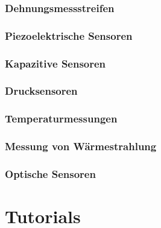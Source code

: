 \documentclass[letterpaper,10pt,english]{jupyterBook}
\begin{document}
\section{Dehnungsmessstreifen}
\label{\detokenize{content/6_DMS:dehnungsmessstreifen}}\label{\detokenize{content/6_DMS::doc}}
\sphinxstepscope


\section{Piezoelektrische Sensoren}
\label{\detokenize{content/6_PZT:piezoelektrische-sensoren}}\label{\detokenize{content/6_PZT::doc}}
\sphinxstepscope


\section{Kapazitive Sensoren}
\label{\detokenize{content/6_Kapazitiv:kapazitive-sensoren}}\label{\detokenize{content/6_Kapazitiv::doc}}
\sphinxstepscope


\section{Drucksensoren}
\label{\detokenize{content/6_Druck:drucksensoren}}\label{\detokenize{content/6_Druck::doc}}
\sphinxstepscope


\section{Temperaturmessungen}
\label{\detokenize{content/6_Temp:temperaturmessungen}}\label{\detokenize{content/6_Temp::doc}}
\sphinxstepscope


\section{Messung von Wärmestrahlung}
\label{\detokenize{content/6_W_xe4rme:messung-von-warmestrahlung}}\label{\detokenize{content/6_W_xe4rme::doc}}
\sphinxstepscope


\section{Optische Sensoren}
\label{\detokenize{content/6_OMT:optische-sensoren}}\label{\detokenize{content/6_OMT::doc}}
\sphinxstepscope


\part{Tutorials}
\end{document}
